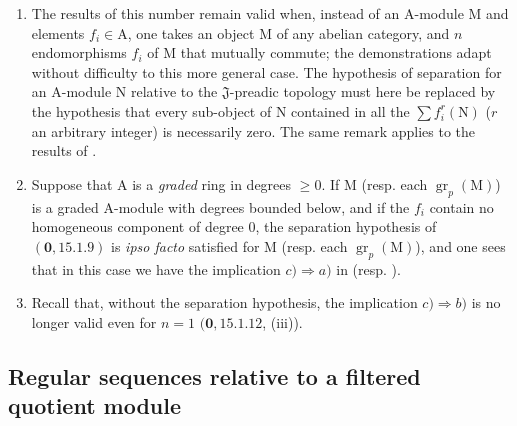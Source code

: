 \begin{remarks}[19.5.6]
\label{IV.19.5.6}
\medskip\noindent
\begin{enumerate}
\item[\rm(i)] The results of this number remain valid when, instead of an $\mathrm{A}$-module $\mathrm{M}$ and elements $f_i\in\mathrm{A}$, one takes an object $\mathrm{M}$ of any abelian category, and $n$ endomorphisms $f_i$ of $\mathrm{M}$ that mutually commute; the demonstrations adapt without difficulty to this more general case. The hypothesis of separation for an $\mathrm{A}$-module $\mathrm{N}$ relative to the $\mathfrak{J}$-preadic topology must here be replaced by the hypothesis that every sub-object of $\mathrm{N}$ contained in all the $\sum f_i^r(\mathrm{N})$ ($r$ an arbitrary integer) is necessarily zero. The same remark applies to the results of .
\item[\rm(ii)] Suppose that $\mathrm{A}$ is a \emph{graded} ring in degrees $\geq0$. If $\mathrm{M}$ (resp. each $\operatorname{gr}_p(\mathrm{M})$) is a graded $\mathrm{A}$-module with degrees bounded below, and if the $f_i$ contain no homogeneous component of degree $0$, the separation hypothesis of $(\mathbf{0},15.1.9)$ is \emph{ipso facto} satisfied for $\mathrm{M}$ (resp. each $\operatorname{gr}_p(\mathrm{M})$), and one sees that in this case we have the implication $c)\Rightarrow a)$ in  (resp. ).
\item[\rm(iii)] Recall that, without the separation hypothesis, the implication $c)\Rightarrow b)$ is no longer valid even for $n=1$ $(\mathbf{0},15.1.12$, (iii)).
\end{enumerate}
\end{remarks}

\subsection{Regular sequences relative to a filtered quotient module}
\label{subsection:IV.19.6}

